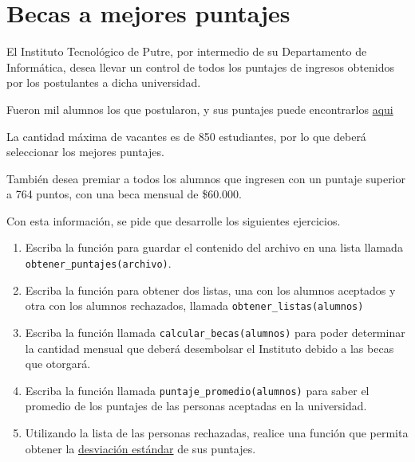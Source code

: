 \section{Becas a mejores puntajes}

El Instituto Tecnológico de Putre, por intermedio de su Departamento de
Informática, desea llevar un control de todos los puntajes de ingresos
obtenidos por los postulantes a dicha universidad.

Fueron mil alumnos los que postularon, y sus puntajes puede encontrarlos
\href{../../\_static/puntajes.txt}{aqui}

La cantidad máxima de vacantes es de 850 estudiantes, por lo que deberá
seleccionar los mejores puntajes.

También desea premiar a todos los alumnos que ingresen con un puntaje
superior a 764 puntos, con una beca mensual de \$60.000.

Con esta información, se pide que desarrolle los siguientes ejercicios.

\begin{enumerate}
\item
  Escriba la función para guardar el contenido del archivo en una lista
  llamada \lstinline!obtener_puntajes(archivo)!.
\item
  Escriba la función para obtener dos listas, una con los alumnos
  aceptados y otra con los alumnos rechazados, llamada
  \lstinline!obtener_listas(alumnos)!
\item
  Escriba la función llamada \lstinline!calcular_becas(alumnos)! para
  poder determinar la cantidad mensual que deberá desembolsar el
  Instituto debido a las becas que otorgará.
\item
  Escriba la función llamada \lstinline!puntaje_promedio(alumnos)! para
  saber el promedio de los puntajes de las personas aceptadas en la
  universidad.
\item
  Utilizando la lista de las personas rechazadas, realice una función
  que permita obtener la
  \href{http://es.wikipedia.org/wiki/Desviaci\%C3\%B3n\_est\%C3\%A1ndar}{desviación
  estándar} de sus puntajes.
\end{enumerate}
